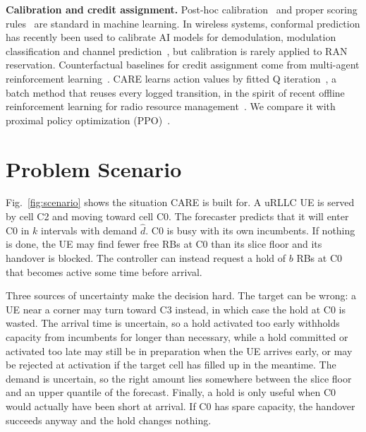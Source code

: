 \documentclass[conference]{IEEEtran}
\begin{document}
\textbf{Calibration and credit assignment.} Post-hoc calibration~\cite{platt1999probabilistic,guo2017calibration} and proper scoring rules~\cite{brier1950verification} are standard in machine learning. In wireless systems, conformal prediction has recently been used to calibrate AI models for demodulation, modulation classification and channel prediction~\cite{cohen2023conformal}, but calibration is rarely applied to RAN reservation. Counterfactual baselines for credit assignment come from multi-agent reinforcement learning~\cite{foerster2018coma}. CARE learns action values by fitted Q iteration~\cite{ernst2005tree,riedmiller2005nfq}, a batch method that reuses every logged transition, in the spirit of recent offline reinforcement learning for radio resource management~\cite{eldeeb2025offline}. We compare it with proximal policy optimization (PPO)~\cite{schulman2017ppo}.

\section{Problem Scenario}\label{sec:scenario}
Fig.~\ref{fig:scenario} shows the situation CARE is built for. A uRLLC UE is served by cell C2 and moving toward cell C0. The forecaster predicts that it will enter C0 in $k$ intervals with demand $\hat d$. C0 is busy with its own incumbents. If nothing is done, the UE may find fewer free RBs at C0 than its slice floor and its handover is blocked. The controller can instead request a hold of $b$ RBs at C0 that becomes active some time before arrival.

Three sources of uncertainty make the decision hard. The target can be wrong: a UE near a corner may turn toward C3 instead, in which case the hold at C0 is wasted. The arrival time is uncertain, so a hold activated too early withholds capacity from incumbents for longer than necessary, while a hold committed or activated too late may still be in preparation when the UE arrives early, or may be rejected at activation if the target cell has filled up in the meantime. The demand is uncertain, so the right amount lies somewhere between the slice floor and an upper quantile of the forecast. Finally, a hold is only useful when C0 would actually have been short at arrival. If C0 has spare capacity, the handover succeeds anyway and the hold changes nothing.
\end{document}
